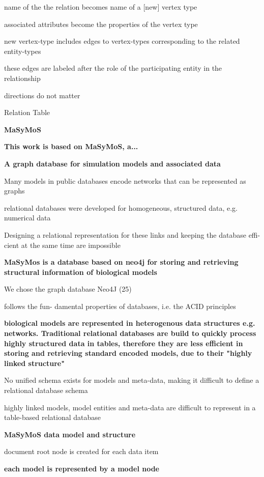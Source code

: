 \par name of the the relation becomes name of a [new] vertex type
\par associated attributes become the properties of the vertex type
\par new vertex-type includes edges to vertex-types corresponding to the related entity-types
\par these edges are labeled after the role of the participating entity in the relationship
\par directions do not matter
\par Relation Table\par \textbf{MaSyMoS}
\par \textbf{This work is based on MaSyMoS, a...}
\par \textbf{A graph database for simulation models and
associated data}

\par Many models in public databases encode networks that
can be represented as graphs
\par relational databases were developed for
homogeneous, structured data, e.g. numerical data
\par  Designing a relational
representation for these links and keeping the database effi-
cient at the same time are impossible\par \textbf{MaSyMos is a database based on neo4j for storing and retrieving structural information of biological models}

\par We chose the
graph database Neo4J (25)
\par follows the fun-
damental properties of databases, i.e. the ACID principles\par \textbf{biological models are represented in heterogenous data structures e.g. networks. Traditional relational databases are build to quickly process highly structured data in tables, therefore they are less efficient in storing and retrieving standard encoded models, due to their "highly linked structure"}

\par  No unified schema exists
for models and meta-data, making it difficult to define a
relational database schema
\par highly linked models,
model entities and meta-data are difficult to represent in a
table-based relational database\par \textbf{MaSyMoS data model and structure}

\par document root node is created for each data
item\par \textbf{each model is represented by a model node}

